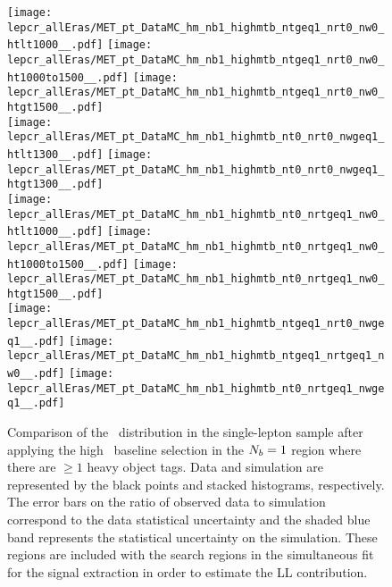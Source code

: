 \begin{figure}[!htb]
	\begin{center}
  \texttt{[image: lepcr\_allEras/MET\_pt\_DataMC\_hm\_nb1\_highmtb\_ntgeq1\_nrt0\_nw0\_htlt1000\_\_.pdf]}
  \texttt{[image: lepcr\_allEras/MET\_pt\_DataMC\_hm\_nb1\_highmtb\_ntgeq1\_nrt0\_nw0\_ht1000to1500\_\_.pdf]}
  \texttt{[image: lepcr\_allEras/MET\_pt\_DataMC\_hm\_nb1\_highmtb\_ntgeq1\_nrt0\_nw0\_htgt1500\_\_.pdf]} \\
  \texttt{[image: lepcr\_allEras/MET\_pt\_DataMC\_hm\_nb1\_highmtb\_nt0\_nrt0\_nwgeq1\_htlt1300\_\_.pdf]} 
  \texttt{[image: lepcr\_allEras/MET\_pt\_DataMC\_hm\_nb1\_highmtb\_nt0\_nrt0\_nwgeq1\_htgt1300\_\_.pdf]} \\
  \texttt{[image: lepcr\_allEras/MET\_pt\_DataMC\_hm\_nb1\_highmtb\_nt0\_nrtgeq1\_nw0\_htlt1000\_\_.pdf]} 
  \texttt{[image: lepcr\_allEras/MET\_pt\_DataMC\_hm\_nb1\_highmtb\_nt0\_nrtgeq1\_nw0\_ht1000to1500\_\_.pdf]} 
  \texttt{[image: lepcr\_allEras/MET\_pt\_DataMC\_hm\_nb1\_highmtb\_nt0\_nrtgeq1\_nw0\_htgt1500\_\_.pdf]} \\
  \texttt{[image: lepcr\_allEras/MET\_pt\_DataMC\_hm\_nb1\_highmtb\_ntgeq1\_nrt0\_nwgeq1\_\_.pdf]} 
  \texttt{[image: lepcr\_allEras/MET\_pt\_DataMC\_hm\_nb1\_highmtb\_ntgeq1\_nrtgeq1\_nw0\_\_.pdf]} 
  \texttt{[image: lepcr\_allEras/MET\_pt\_DataMC\_hm\_nb1\_highmtb\_nt0\_nrtgeq1\_nwgeq1\_\_.pdf]} \\
	\end{center}
	\caption[Lost Lepton HM Control Region $\nb=1$]{Comparison of the \met~distribution in the single-lepton sample after applying the high \dm~baseline selection in the $\nb=1$ region where there are $\geq1$ heavy object tags. Data and simulation are represented by the black points and stacked histograms, respectively. The error bars on the ratio of observed data to simulation correspond to the data statistical uncertainty and the shaded blue band represents the statistical uncertainty on the simulation. These regions are included with the search regions in the simultaneous fit for the signal extraction in order to estimate the LL contribution.
	 }
	\label{fig:llb-1lcr-datavsmc-hm-nb1}
\end{figure}

